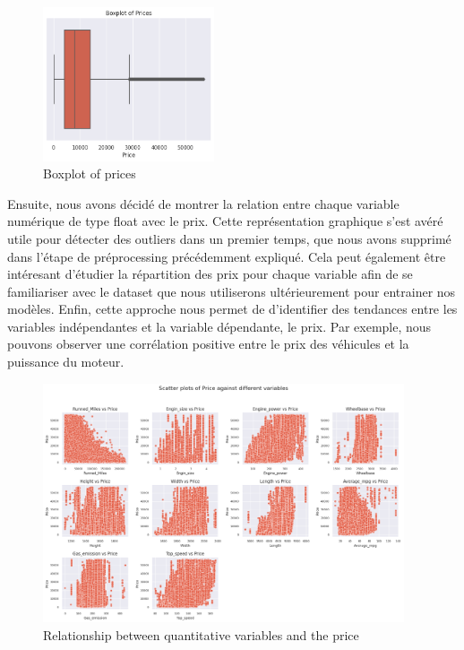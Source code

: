 \documentclass[12pt]{article}
\begin{document}
\FloatBarrier
\begin{figure}[ht]
    \centering
    \includegraphics[width=0.45\textwidth]{boxplot price.png}
    \caption{Boxplot of prices}
    \label{fig:boxplot}
\end{figure}
\FloatBarrier

\noindent Ensuite, nous avons décidé de montrer la relation entre chaque variable numérique de type float avec le prix. Cette représentation graphique s'est avéré utile pour détecter des outliers dans un premier temps, que nous avons supprimé dans l'étape de préprocessing précédemment expliqué. Cela peut également être intéresant d'étudier la répartition des prix pour chaque variable afin de se familiariser avec le dataset que nous utiliserons ultérieurement pour entrainer nos modèles. Enfin, cette approche nous permet de d'identifier des tendances entre les variables indépendantes et la variable dépendante, le prix. Par exemple, nous pouvons observer une corrélation positive entre le prix des véhicules et la puissance du moteur.

\begin{figure}[ht]
    \centering
    \includegraphics[width=0.95\textwidth]{numerique variables.png}
    \caption{Relationship between quantitative variables and the price}
    \label{fig:boxplot}
\end{figure}
\\
\FloatBarrier
\end{document}
